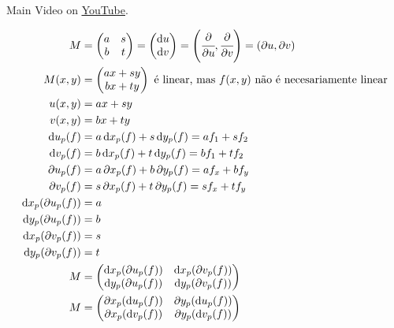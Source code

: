 \documentclass[12pt]{article}
\begin{document}
Main Video on \href{https://www.youtube.com/watch?v=mmzqmIcX7xo}{\color{blue}\underline{YouTube}}.

\begin{align}
  M &= \left( \begin{matrix} a & s \\ b & t \end{matrix} \right) = \left( \begin{matrix} \mathrm{d}u \\ \mathrm{d}v \end{matrix} \right) = \left(\cfrac{\partial}{\partial u}, \cfrac{\partial}{\partial v}\right) = (\partial u, \partial v) \\
  M(x,y) &= \left( \begin{matrix} ax + sy \\ bx + ty \end{matrix} \right) \text{ \'e linear, mas }f(x,y) \text{ n\~ao \'e necesariamente linear} \\
  u(x,y) &= ax + sy \\
  v(x,y) &= bx + ty \\
  \mathrm{d}u_p(f) &= a\, \mathrm{d}x_p(f) + s\, \mathrm{d}y_p(f) = af_1 + sf_2 \\
  \mathrm{d}v_p(f) &= b\, \mathrm{d}x_p(f) + t\, \mathrm{d}y_p(f) = bf_1 + tf_2 \\
  \partial u_p(f) &= a\, \partial x_p(f) + b\, \partial y_p(f) = af_x + bf_y \\
  \partial v_p(f) &= s\, \partial x_p(f) + t\, \partial y_p(f) = sf_x + tf_y \\
  \mathrm{d}x_p ( \partial u_p(f) ) &= a \\
  \mathrm{d}y_p ( \partial u_p(f) ) &= b \\
  \mathrm{d}x_p ( \partial v_p(f) ) &= s \\
  \mathrm{d}y_p ( \partial v_p(f) ) &= t \\
  M &= \left( \begin{matrix} \mathrm{d}x_p ( \partial u_p(f) ) & \mathrm{d}x_p ( \partial v_p(f) ) \\ \mathrm{d}y_p ( \partial u_p(f) ) & \mathrm{d}y_p ( \partial v_p(f) ) \end{matrix} \right) \\
  M &= \left( \begin{matrix} \partial x_p(\mathrm{d}u_p(f)) & \partial y_p(\mathrm{d}u_p(f)) \\ \partial x_p(\mathrm{d}v_p(f)) & \partial y_p(\mathrm{d}v_p(f)) \end{matrix} \right) \\

\end{align}
\end{document}
